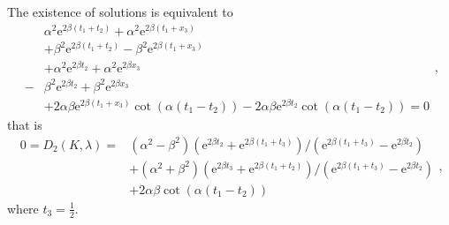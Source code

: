 \documentclass[a4paper,11pt]{article}
\begin{document}
\begin{appendices}
The existence of solutions is equivalent to
\begin{equation*}
\begin{split}
& \alpha^2 \mathrm{e}^{2 \beta (t_1 + t_2)}  + \alpha^2 \mathrm{e}^{2 \beta (t_1 + x_{3})} \\
& + \beta^2 \mathrm{e}^{2 \beta (t_1 + t_2)} - \beta^2 \mathrm{e}^{2 \beta (t_1 + x_{3})} \\
& + \alpha^2 \mathrm{e}^{2 \beta t_2}  + \alpha^2 \mathrm{e}^{2 \beta x_{3}} \\
- & \beta^2 \mathrm{e}^{2 \beta t_2} + \beta^2 \mathrm{e}^{2 \beta x_{3}} \\
& + 2 \alpha \beta \mathrm{e}^{2 \beta (t_1 + x_{3})} \cot(\alpha (t_1 - t_2)) - 2 \alpha \beta \mathrm{e}^{2 \beta t_2} \cot(\alpha (t_1 - t_2)) = 0
\end{split},
\end{equation*}
that is
\begin{equation*}
\begin{split}
0 = D_2(K, \lambda) = & (\alpha^2 - \beta^2)(\mathrm{e}^{2 \beta t_2} + \mathrm{e}^{2 \beta (t_1+t_3)}) / (\mathrm{e}^{2 \beta (t_1+t_3)} - \mathrm{e}^{2 \beta t_2}) \\
& + (\alpha^2 + \beta^2)(\mathrm{e}^{2 \beta t_3} + \mathrm{e}^{2 \beta (t_1+t_2)}) / (\mathrm{e}^{2 \beta (t_1+t_3)} - \mathrm{e}^{2 \beta t_2}) \\
& + 2 \alpha \beta \cot(\alpha (t_1 - t_2))
\end{split},
\end{equation*}
where $t_3 = \frac12$.

\end{appendices}
\end{document}
